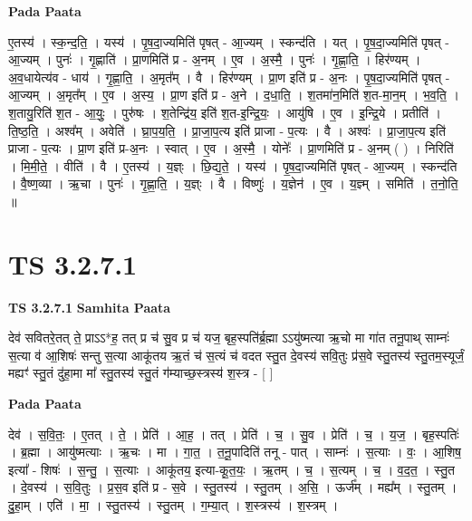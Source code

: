 \documentclass[17pt]{extarticle}
\begin{document}
\textbf{Pada Paata} \newline

ए॒तस्य॑ । स्क॒न्द॒ति॒ । यस्य॑ । पृ॒ष॒दा॒ज्यमिति॑ पृषत् - आ॒ज्यम् । स्कन्द॑ति । यत् । पृ॒ष॒दा॒ज्यमिति॑ पृषत् - आ॒ज्यम् । पुनः॑ । गृ॒ह्णाति॑ । प्रा॒णमिति॑ प्र - अ॒नम् । ए॒व । अ॒स्मै॒ । पुनः॑ । गृ॒ह्णा॒ति॒ । हिर॑ण्यम् । अ॒व॒धायेत्य॑व - धाय॑ । गृ॒ह्णा॒ति॒ । अ॒मृत᳚म् । वै । हिर॑ण्यम् । प्रा॒ण इति॑ प्र - अ॒नः । पृ॒ष॒दा॒ज्यमिति॑ पृषत् - आ॒ज्यम् । अ॒मृत᳚म् । ए॒व । अ॒स्य॒ । प्रा॒ण इति॑ प्र - अ॒ने । द॒धा॒ति॒ । श॒तमा॑न॒मिति॑ श॒त-मा॒न॒म् । भ॒व॒ति॒ । श॒तायु॒रिति॑ श॒त - आ॒युः॒ । पुरु॑षः । श॒तेन्द्रि॑य॒ इति॑ श॒त-इ॒न्द्रि॒यः॒ । आयु॑षि । ए॒व । इ॒न्द्रि॒ये । प्रतीति॑ । ति॒ष्ठ॒ति॒ । अश्व᳚म् । अवेति॑ । घ्रा॒प॒य॒ति॒ । प्रा॒जा॒प॒त्य इति॑ प्राजा - प॒त्यः । वै । अश्वः॑ । प्रा॒जा॒प॒त्य इति॑ प्राजा - प॒त्यः । प्रा॒ण इति॑ प्र-अ॒नः । स्वात् । ए॒व । अ॒स्मै॒ । योनेः᳚ । प्रा॒णमिति॑ प्र - अ॒नम् ( ) । निरिति॑ । मि॒मी॒ते॒ । वीति॑ । वै । ए॒तस्य॑ । य॒ज्ञ्ः । छि॒द्य॒ते॒ । यस्य॑ । पृ॒ष॒दा॒ज्यमिति॑ पृषत् - आ॒ज्यम् । स्कन्द॑ति । वै॒ष्ण॒व्या । ऋ॒चा । पुनः॑ । गृ॒ह्णा॒ति॒ । य॒ज्ञ्ः । वै । विष्णुः॑ । य॒ज्ञेन॑ । ए॒व । य॒ज्ञ्म् । समिति॑ । त॒नो॒ति॒ ॥  \newline




\section*{ TS 3.2.7.1 }

\textbf{TS 3.2.7.1 } \newline
\textbf{Samhita Paata} \newline

देव॑ सवितरे॒तत् ते॒ प्राऽऽ*ह॒ तत् प्र च॑ सु॒व प्र च॑ यज॒ बृह॒स्पति॑र्ब्र॒ह्मा ऽऽयु॑ष्मत्या ऋ॒चो मा गा॑त तनू॒पाथ् साम्नः॑ स॒त्या व॑ आ॒शिषः॑ सन्तु स॒त्या आकू॑तय ऋ॒तं च॑ स॒त्यं च॑ वदत स्तु॒त दे॒वस्य॑ सवि॒तुः प्र॑स॒वे स्तु॒तस्य॑ स्तु॒तम॒स्यूर्जं॒ मह्यꣳ॑ स्तु॒तं दु॑हा॒मा मा᳚ स्तु॒तस्य॑ स्तु॒तं ग॑म्याच्छ॒स्त्रस्य॑ श॒स्त्र - [  ] \newline

\textbf{Pada Paata} \newline

देव॑ । स॒वि॒तः॒ । ए॒तत् । ते॒ । प्रेति॑ । आ॒ह॒ । तत् । प्रेति॑ । च॒ । सु॒व । प्रेति॑ । च॒ । य॒ज॒ । बृह॒स्पतिः॑ । ब्र॒ह्मा । आयु॑ष्मत्याः । ऋ॒चः । मा । गा॒त॒ । त॒नू॒पादिति॑ तनू - पात् । साम्नः॑ । स॒त्याः । वः॒ । आ॒शिष॒ इत्या᳚ - शिषः॑ । स॒न्तु॒ । स॒त्याः । आकू॑तय॒ इत्या-कू॒त॒यः॒ । ऋ॒तम् । च॒ । स॒त्यम् । च॒ । व॒द॒त॒ । स्तु॒त । दे॒वस्य॑ । स॒वि॒तुः । प्र॒स॒व इति॑ प्र - स॒वे । स्तु॒तस्य॑ । स्तु॒तम् । अ॒सि॒ । ऊर्ज᳚म् । मह्य᳚म् । स्तु॒तम् । दु॒हा॒म् । एति॑ । मा॒ । स्तु॒तस्य॑ । स्तु॒तम् । ग॒म्या॒त् । श॒स्त्रस्य॑ । श॒स्त्रम् ।  \newline
\end{document}
